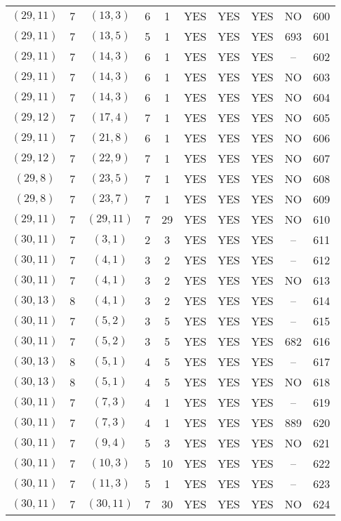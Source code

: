 \begin{longtable}{|c|c|c|c|c|c|c|c|c|c|}
$(29, 11)$ & 7 & $(13, 3)$ & 6 & 1 & YES & YES & YES & NO & 600\\
$(29, 11)$ & 7 & $(13, 5)$ & 5 & 1 & YES & YES & YES & 693 & 601\\
$(29, 11)$ & 7 & $(14, 3)$ & 6 & 1 & YES & YES & YES & -- & 602\\
$(29, 11)$ & 7 & $(14, 3)$ & 6 & 1 & YES & YES & YES & NO & 603\\
$(29, 11)$ & 7 & $(14, 3)$ & 6 & 1 & YES & YES & YES & NO & 604\\
$(29, 12)$ & 7 & $(17, 4)$ & 7 & 1 & YES & YES & YES & NO & 605\\
$(29, 11)$ & 7 & $(21, 8)$ & 6 & 1 & YES & YES & YES & NO & 606\\
$(29, 12)$ & 7 & $(22, 9)$ & 7 & 1 & YES & YES & YES & NO & 607\\
$(29, 8)$ & 7 & $(23, 5)$ & 7 & 1 & YES & YES & YES & NO & 608\\
$(29, 8)$ & 7 & $(23, 7)$ & 7 & 1 & YES & YES & YES & NO & 609\\
$(29, 11)$ & 7 & $(29, 11)$ & 7 & 29 & YES & YES & YES & NO & 610\\
$(30, 11)$ & 7 & $(3, 1)$ & 2 & 3 & YES & YES & YES & -- & 611\\
$(30, 11)$ & 7 & $(4, 1)$ & 3 & 2 & YES & YES & YES & -- & 612\\
$(30, 11)$ & 7 & $(4, 1)$ & 3 & 2 & YES & YES & YES & NO & 613\\
$(30, 13)$ & 8 & $(4, 1)$ & 3 & 2 & YES & YES & YES & -- & 614\\
$(30, 11)$ & 7 & $(5, 2)$ & 3 & 5 & YES & YES & YES & -- & 615\\
$(30, 11)$ & 7 & $(5, 2)$ & 3 & 5 & YES & YES & YES & 682 & 616\\
$(30, 13)$ & 8 & $(5, 1)$ & 4 & 5 & YES & YES & YES & -- & 617\\
$(30, 13)$ & 8 & $(5, 1)$ & 4 & 5 & YES & YES & YES & NO & 618\\
$(30, 11)$ & 7 & $(7, 3)$ & 4 & 1 & YES & YES & YES & -- & 619\\
$(30, 11)$ & 7 & $(7, 3)$ & 4 & 1 & YES & YES & YES & 889 & 620\\
$(30, 11)$ & 7 & $(9, 4)$ & 5 & 3 & YES & YES & YES & NO & 621\\
$(30, 11)$ & 7 & $(10, 3)$ & 5 & 10 & YES & YES & YES & -- & 622\\
$(30, 11)$ & 7 & $(11, 3)$ & 5 & 1 & YES & YES & YES & -- & 623\\
$(30, 11)$ & 7 & $(30, 11)$ & 7 & 30 & YES & YES & YES & NO & 624\\

\end{longtable}
